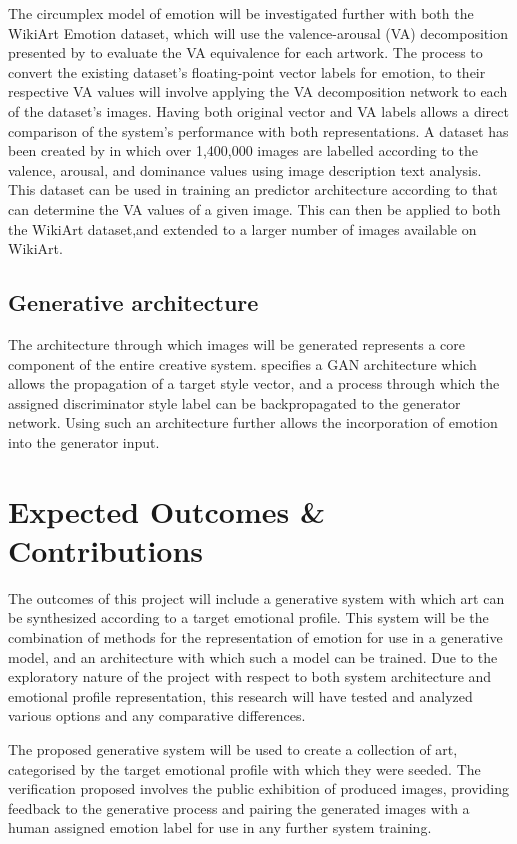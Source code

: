 \documentclass{article}
\begin{document}
The circumplex model of emotion will be investigated further with both the WikiArt Emotion dataset, which will use the valence-arousal (VA) decomposition presented by \citet{kim2018building} to evaluate the VA equivalence for each artwork.
The process to convert the existing dataset's floating-point vector labels for emotion, to their respective VA values will involve applying the VA decomposition network to each of the dataset's images.
Having both original vector and VA labels allows a direct comparison of the system's performance with both representations.
A dataset has been created by \citet{zhao2016predicting} in which over 1,400,000 images are labelled according to the valence, arousal, and dominance values using image description text analysis.
This dataset can be used in training an predictor architecture according to \citet{kim2018building} that can determine the VA values of a given image.
This can then be applied to both the WikiArt dataset,and extended to a larger number of images available on WikiArt.

\subsection{Generative architecture}
The architecture through which images will be generated represents a core component of the entire creative system.
\citet{tan2017artgan} specifies a GAN architecture which allows the propagation of a target style vector, and a process through which the assigned discriminator style label can be backpropagated to the generator network.
Using such an architecture further allows the incorporation of emotion into the generator input.


\section{Expected Outcomes \& Contributions}

The outcomes of this project will include a generative system with which art can be synthesized according to a target emotional profile.
This system will be the combination of methods for the representation of emotion for use in a generative model, and an architecture with which such a model can be trained.
Due to the exploratory nature of the project with respect to both system architecture and emotional profile representation, this research will have tested and analyzed various options and any comparative differences.

The proposed generative system will be used to create a collection of art, categorised by the target emotional profile with which they were seeded.
The verification proposed involves the public exhibition of produced images, providing feedback to the generative process and pairing the generated images with a human assigned emotion label for use in any further system training.




\end{document}
